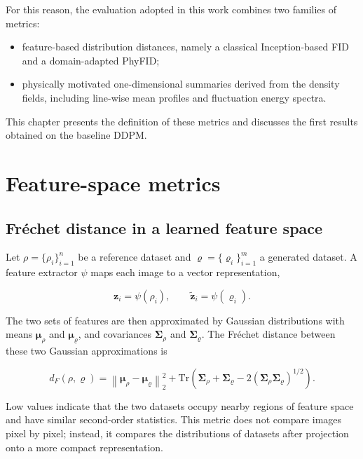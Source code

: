 For this reason, the evaluation adopted in this work combines two families of
metrics:

\begin{itemize}
    \item feature-based distribution distances, namely a classical
    Inception-based FID and a domain-adapted PhyFID;
    \item physically motivated one-dimensional summaries derived from the
    density fields, including line-wise mean profiles and fluctuation energy
    spectra.
\end{itemize}

This chapter presents the definition of these metrics and discusses the first
results obtained on the baseline DDPM.


\section{Feature-space metrics}

\subsection{Fr\'echet distance in a learned feature space}

Let $\rho=\{\rho_i\}_{i=1}^{n}$ be a reference dataset and
$\varrho=\{\varrho_i\}_{i=1}^{m}$ a generated dataset. A feature extractor
$\psi$ maps each image to a vector representation,

\begin{equation}
    \mathbf{z}_i = \psi(\rho_i),
    \qquad
    \widetilde{\mathbf{z}}_i = \psi(\varrho_i).
\end{equation}

The two sets of features are then approximated by Gaussian distributions with
means $\boldsymbol{\mu}_{\rho}$ and $\boldsymbol{\mu}_{\varrho}$, and
covariances $\mathbf{\Sigma}_{\rho}$ and $\mathbf{\Sigma}_{\varrho}$. The
Fr\'echet distance between these two Gaussian approximations is

\begin{equation}
    d_F(\rho,\varrho)
    =
    \left\|
    \boldsymbol{\mu}_{\rho}
    -
    \boldsymbol{\mu}_{\varrho}
    \right\|_2^2
    +
    \mathrm{Tr}\!\left(
        \mathbf{\Sigma}_{\rho}
        +
        \mathbf{\Sigma}_{\varrho}
        -
        2\left(\mathbf{\Sigma}_{\rho}\mathbf{\Sigma}_{\varrho}\right)^{1/2}
    \right).
\end{equation}

Low values indicate that the two datasets occupy nearby regions of feature
space and have similar second-order statistics. This metric does not compare
images pixel by pixel; instead, it compares the distributions of datasets after
projection onto a more compact representation.

